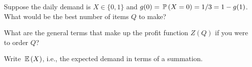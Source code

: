 \begin{exercise}
Suppose the daily demand is $X\in \{0,1\}$ and $g(0) = \P(X=0)=1/3 = 1- g(1)$. What would be the best number of items $Q$ to make? 

\end{exercise}


\begin{exercise}
  What are the general terms that make up the profit function $Z(Q)$ if you were to order $Q$? 

\end{exercise}

\begin{exercise}
  Write $\E(X)$, i.e., the expected demand in terms of a summation.

\end{exercise}

